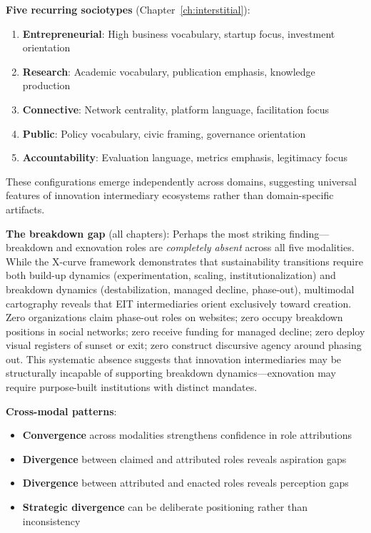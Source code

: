 \documentclass[../main.tex]{subfiles}
\begin{document}
\textbf{Five recurring sociotypes} (Chapter~\ref{ch:interstitial}):
\begin{enumerate}[leftmargin=*, itemsep=0.2em]
\item \textbf{Entrepreneurial}: High business vocabulary, startup focus, investment orientation
\item \textbf{Research}: Academic vocabulary, publication emphasis, knowledge production
\item \textbf{Connective}: Network centrality, platform language, facilitation focus
\item \textbf{Public}: Policy vocabulary, civic framing, governance orientation
\item \textbf{Accountability}: Evaluation language, metrics emphasis, legitimacy focus
\end{enumerate}

These configurations emerge independently across domains, suggesting universal features of innovation intermediary ecosystems \cite{adner2017ecosystem,jacobides2018ecosystems} rather than domain-specific artifacts.

\textbf{The breakdown gap} (all chapters): Perhaps the most striking finding---breakdown and exnovation roles are \emph{completely absent} across all five modalities. While the X-curve framework demonstrates that sustainability transitions require both build-up dynamics (experimentation, scaling, institutionalization) and breakdown dynamics (destabilization, managed decline, phase-out), multimodal cartography reveals that EIT intermediaries orient exclusively toward creation. Zero organizations claim phase-out roles on websites; zero occupy breakdown positions in social networks; zero receive funding for managed decline; zero deploy visual registers of sunset or exit; zero construct discursive agency around phasing out. This systematic absence suggests that innovation intermediaries may be structurally incapable of supporting breakdown dynamics---exnovation may require purpose-built institutions with distinct mandates.

\textbf{Cross-modal patterns}:
\begin{itemize}[leftmargin=*, itemsep=0.2em]
\item \textbf{Convergence} across modalities strengthens confidence in role attributions
\item \textbf{Divergence} between claimed and attributed roles reveals aspiration gaps
\item \textbf{Divergence} between attributed and enacted roles reveals perception gaps
\item \textbf{Strategic divergence} can be deliberate positioning rather than inconsistency
\end{itemize}
\end{document}
